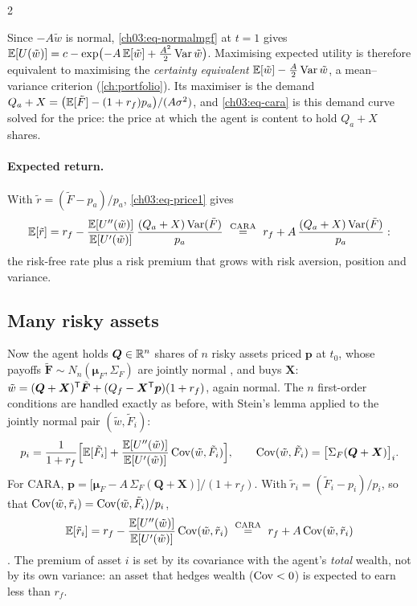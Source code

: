 \begin{paracol}{2}
\begin{remark}[CARA and normal = mean--variance; not discussed in class]\label{ch03:rem-meanvar}
Since $-A\tilde w$ is normal, \eqref{ch03:eq-normalmgf} at $t=1$ gives $\mathbb{E}[U(\tilde w)]=c-\exp\bigl(-A\,\mathbb{E}[\tilde w]+\frac{A^2}{2}\operatorname{Var}\tilde w\bigr)$.
Maximising expected utility is therefore equivalent to maximising the \emph{certainty equivalent}
$\mathbb{E}[\tilde w]-\frac A2\operatorname{Var}\tilde w$, a mean--variance criterion (\cref{ch:portfolio}). Its maximiser is the demand
$Q_a+X=\bigl(\mathbb{E}[\tilde F]-(1+r_f)p_a\bigr)/(A\sigma^2)$, and \eqref{ch03:eq-cara} is this demand curve solved for the price:
the price at which the agent is content to hold $Q_a+X$ shares.
\end{remark}

\paragraph{Expected return.} With $\tilde r=(\tilde F-p_a)/p_a$, \eqref{ch03:eq-price1} gives
\[
  \mathbb{E}[\tilde r]=r_f-\frac{\mathbb{E}[U''(\tilde w)]}{\mathbb{E}[U'(\tilde w)]}\,\frac{(Q_a+X)\operatorname{Var}(\tilde F)}{p_a}
  \ \overset{\text{CARA}}{=}\ r_f+A\,\frac{(Q_a+X)\operatorname{Var}(\tilde F)}{p_a}:
\]
the risk-free rate plus a risk premium that grows with risk aversion, position and variance.

\subsection{Many risky assets}
Now the agent holds $\bm Q\in\mathbb{R}^n$ shares of $n$ risky assets priced $\bm p$ at $t_0$, whose payoffs
$\tilde{\bm F}\sim N_n(\bm\mu_F,\Sigma_F)$ are jointly normal , and buys $\bm X$:
$\tilde w=(\bm Q+\bm X)^{\mathsf T}\tilde{\bm F}+(Q_f-\bm X^{\mathsf T}\bm p)(1+r_f)$, again normal. The $n$ first-order conditions are handled
exactly as before, with Stein's lemma applied to the jointly normal pair $(\tilde w,\tilde F_i)$:
\[
  p_i=\frac{1}{1+r_f}\Bigl[\mathbb{E}[\tilde F_i]+\frac{\mathbb{E}[U''(\tilde w)]}{\mathbb{E}[U'(\tilde w)]}\operatorname{Cov}(\tilde w,\tilde F_i)\Bigr],\qquad
  \operatorname{Cov}(\tilde w,\tilde F_i)=\bigl[\Sigma_F(\bm Q+\bm X)\bigr]_i .
\]
For CARA, $\bm p=\bigl[\bm\mu_F-A\,\Sigma_F(\bm Q+\bm X)\bigr]/(1+r_f)$. With $\tilde r_i=(\tilde F_i-p_i)/p_i$, so that
$\operatorname{Cov}(\tilde w,\tilde r_i)=\operatorname{Cov}(\tilde w,\tilde F_i)/p_i$,
\[
  \mathbb{E}[\tilde r_i]=r_f-\frac{\mathbb{E}[U''(\tilde w)]}{\mathbb{E}[U'(\tilde w)]}\operatorname{Cov}(\tilde w,\tilde r_i)\ \overset{\text{CARA}}{=}\ r_f+A\operatorname{Cov}(\tilde w,\tilde r_i)
\]
. The premium of asset $i$ is set by its covariance with the agent's \emph{total} wealth, not by its
own variance: an asset that hedges wealth ($\operatorname{Cov}<0$) is expected to earn less than $r_f$.


\end{paracol}
